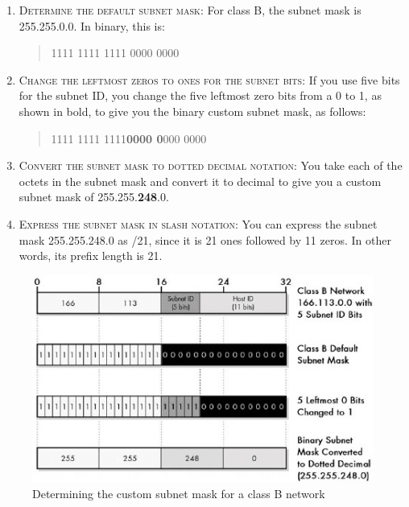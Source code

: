 \begin{enumerate}
   \item
      \textsc{Determine the default subnet mask}:
      For class B, the subnet mask is 255.255.0.0. In binary, this is:
      \begin{quote}
         1111 1111 1111 0000 0000
      \end{quote}

   \item
      \textsc{Change the leftmost zeros to ones for the subnet bits}:
      If you use five bits for the subnet ID, you change the five leftmost zero bits from a 0 to 1,
      as shown in bold, to give you the binary custom subnet mask, as follows:
      \begin{quote}
         1111 1111 1111\quad \textbf{0000 0}000 0000
      \end{quote}

   \item
      \textsc{Convert the subnet mask to dotted decimal notation}:
      You take each of the octets in the subnet mask and convert it to decimal to give you a custom subnet mask of 255.255.\textbf{248}.0.

   \item
      \textsc{Express the subnet mask in slash notation}:
      You can express the subnet mask 255.255.248.0 as /21, since it is 21 ones followed by 11 zeros.
      In other words, its prefix length is 21.
\end{enumerate}

 
\begin{figure}
   \centering
   \includegraphics[width=.8\textwidth]{images/determining-custom-subnet-b.jpg}
   \caption{Determining the custom subnet mask for a class B network}
   \label{fig:determining-custom-subnet-b}
\end{figure}


